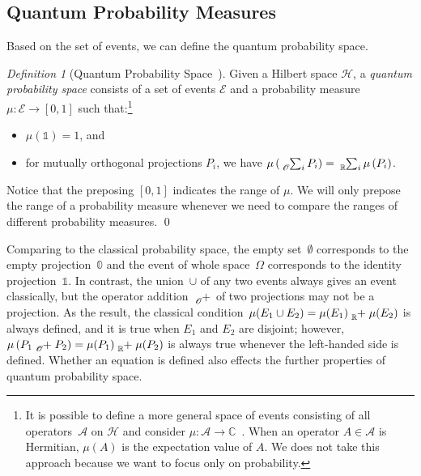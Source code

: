 \documentclass{article}
\theoremstyle{remark}
\newtheorem{definition}{Definition}
\newcommand{\events}{\ensuremath{\mathcal{E}}}
\newcommand{\pmeas}{\ensuremath{\mu}}
\newcommand{\Hilb}{\mathcal{H}}
\def\C{{\mathbb{C}}}
\begin{document}
\subsection{Quantum Probability Measures}

Based on the set of events, we can define the quantum probability
space.

\begin{definition}[Quantum Probability
Space~\cite{10.2307/2308516,gleason1957,Redhead1987-REDINA,Maassen2010}]\label{def:QuantumProbabilitySpace}
  Given a Hilbert space $\Hilb$, a \emph{quantum probability space}
  consists of a set of events $\events$ and a probability measure
  $\mu : \events \rightarrow [0,1]$ such
  that:\footnote {It is possible to define a more general space of events consisting of
    all operators~$\mathcal{A}$ on $\Hilb$ and consider
    $\mu:\mathcal{A}\rightarrow\C$~\cite{Maassen2010,Swart2013}.  When
    an operator $A\in\mathcal{A}$ is Hermitian, $\mu\left(A\right)$ is
    the expectation value of $A$. We does not take this approach
    because we want to focus only on probability. }
\begin{itemize}
\item $\mu(\mathbb{1})=1$, and 
\item for mutually orthogonal projections $P_{i}$, we have 
$\mu\left(\tensor*[_{\mathscr{O}}]{\sum}{_{i}}P_{i}\right)=\tensor*[_{\mathbb{R}}]{\sum}{_{i}}\mu\left(P_{i}\right)$.
\end{itemize}
Notice that the preposing $[0,1]$ indicates the range of
$\mu$. We will only prepose the range of a
probability measure whenever we need to compare the ranges of different
probability measures. 
\qed\end{definition}

Comparing to the classical probability space, the empty set~$\emptyset$
corresponds to the empty projection~$\mathbb{0}$ and the event of
whole space~$\Omega$ corresponds to the identity projection~$\mathbb{1}$.
In contrast, the union~$\cup$ of any two events always gives an
event classically, but the operator addition~$\tensor*[_{\mathscr{O}}]{+}{}$
of two projections may not be a projection. As the result, the classical
condition~$\pmeas(E_{1}\cup E_{2})=\pmeas(E_{1})\tensor*[_{\mathbb{R}}]{+}{}\pmeas(E_{2})$
is always defined, and it is true when $E_{1}$ and $E_{2}$ are disjoint;
however, $\mu\left(P_{1}\tensor*[_{\mathscr{O}}]{+}{}P_{2}\right)=\mu(P_{1})\tensor*[_{\mathbb{R}}]{+}{}\mu(P_{2})$
is always true whenever the left-handed side is defined. Whether an equation
is defined also effects the further properties of quantum probability
space.
\end{document}
